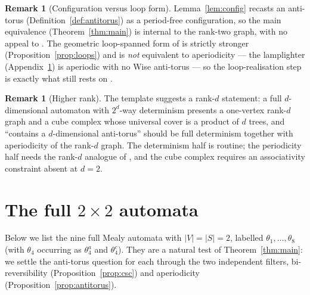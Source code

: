 \documentclass[11pt,reqno]{amsart}
\theoremstyle{plain}
\theoremstyle{definition}
\newtheorem{remark}[theorem]{Remark}
\begin{document}
\begin{remark}[Configuration versus loop form]
Lemma~\ref{lem:config} recasts an anti-torus (Definition~\ref{def:antitorus}) as a
period-free configuration, so the main equivalence (Theorem~\ref{thm:main}) is
internal to the rank-two graph, with no appeal to \cite{W,GM}. The geometric
loop-spanned form of \cite{W} is strictly stronger
(Proposition~\ref{prop:loops}) and is \emph{not} equivalent to aperiodicity --- the
lamplighter (Appendix~\ref{app:2x2}) is aperiodic with no Wise anti-torus --- so the
loop-realisation step is exactly what still rests on \cite{W,GM}.
\end{remark}

\begin{remark}[Higher rank]
The template suggests a rank-$d$ statement: a full $d$-dimensional automaton with
$2^d$-way determinism presents a one-vertex rank-$d$ graph and a cube complex whose
universal cover is a product of $d$ trees, and ``contains a $d$-dimensional
anti-torus'' should be full determinism together with aperiodicity of the rank-$d$
graph. The determinism half is routine; the periodicity half needs the rank-$d$
analogue of \cite{DY}, and the cube complex requires an associativity constraint
absent at $d=2$.
\end{remark}

\appendix

\section{The full \texorpdfstring{$2\times2$}{2x2} automata}\label{app:2x2}

Below we list the nine full Mealy automata with $|V|=|S|=2$,
labelled $\theta_1,\dots,\theta_8$ (with $\theta_4$ occurring as $\theta_4^a$ and
$\theta_4^c$). They are a natural test of Theorem~\ref{thm:main}: we settle the
anti-torus question for each through the two independent filters, bi-reversibility
(Proposition~\ref{prop:csc}) and aperiodicity (Proposition~\ref{prop:antitorus}).
\end{document}
